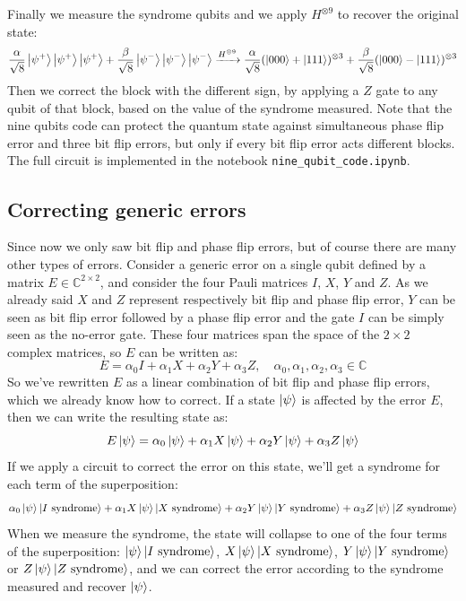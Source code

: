 \documentclass{article}
\begin{document}
	Finally we  measure the syndrome qubits and we apply $H^{\otimes 9}$ to recover the original state:
	\[ \frac{\alpha}{\sqrt{8}}\ket{\psi^+}\ket{\psi^+}\ket{\psi^+} + \frac{\beta}{\sqrt{8}}\ket{\psi^-}\ket{\psi^-}\ket{\psi^-} \xrightarrow{H^{\otimes 9}} \frac{\alpha}{\sqrt{8}}(\ket{000} + \ket{111})^{\otimes 3} + \frac{\beta}{\sqrt{8}}(\ket{000} - \ket{111})^{\otimes 3} \]
	Then we correct the block with the different sign, by applying a $Z$ gate to any qubit of that block, based on the value of the syndrome measured. Note that the nine qubits code can protect the quantum state against simultaneous phase flip error and three bit flip errors, but only if every bit flip error acts different blocks.\\ The full circuit is implemented in the notebook \verb|nine_qubit_code.ipynb|.
	
	\subsection{Correcting generic errors}
	Since now we only saw bit flip and phase flip errors, but of course there are many other types of errors. Consider a generic error on a single qubit defined by a matrix $E \in \mathbb{C}^{2 \times 2}$, and consider the four Pauli matrices $I$, $X$, $Y$ and $Z$. As we already said $X$ and $Z$ represent respectively bit flip and phase flip error, $Y$ can be seen as bit flip error followed by a phase flip error and the gate $I$ can be simply seen as the no-error gate. These four matrices span the space of the $2 \times 2$ complex matrices, so $E$ can be written as:
	\[ E = \alpha_0I + \alpha_1X + \alpha_2Y + \alpha_3Z, \quad \alpha_0, \alpha_1, \alpha_2, \alpha_3 \in \mathbb{C}\]
	So we've rewritten $E$ as a linear combination of bit flip and phase flip errors, which we already know how to correct. If a state $\ket{\psi}$ is affected by the error $E$, then we can write the resulting state as: 
	\[ E\ket{\psi} = \alpha_0\ket{\psi} + \alpha_1X\ket{\psi} + \alpha_2Y\ket{\psi} + \alpha_3Z\ket{\psi} \]
	If we apply a circuit to correct the error on this state, we'll get a syndrome for each term of the superposition:
	\[ \alpha_0\ket{\psi}\ket{I \text{ syndrome}} + \alpha_1X\ket{\psi}\ket{X \text{ syndrome}} + \alpha_2Y\ket{\psi}\ket{Y \text{ syndrome}} + \alpha_3Z\ket{\psi}\ket{Z \text{ syndrome}} \]
	When we measure the syndrome, the state will collapse to one of the four terms of the superposition: $\ket{\psi}\ket{I \text{ syndrome}}$, $X\ket{\psi}\ket{X \text{ syndrome}}$, $Y\ket{\psi}\ket{Y \text{ syndrome}}$ or $Z\ket{\psi}\ket{Z \text{ syndrome}}$, and we can correct the error according to the syndrome measured and recover $\ket{\psi}$.
	
\end{document}
